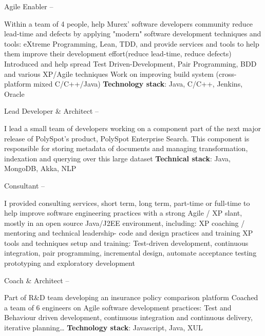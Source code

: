 \documentclass[a4paper,MMMyyyy,nonstopmode]{simpleresumecv}
\begin{document}
\begin{Body}
\Entry
Agile Enabler
\hfill
{} --
\begin{Detail}
\BulletItem Within a team of 4 people, help Murex' software developers community reduce lead-time and defects by applying "modern" software development techniques and tools: eXtreme Programming, Lean, TDD, and provide services and tools to help them improve their development effort(reduce lead-time, reduce defects)
\BulletItem Introduced and help spread Test Driven-Development, Pair Programming, BDD and various XP/Agile techniques
\BulletItem Work on improving build system (cross-platform mixed C/C++/Java)
\BulletItem \textbf{Technology stack}: Java, C/C++, Jenkins, Oracle
\end{Detail}


\Entry
Lead Developer \& Architect
\hfill
{} --
\begin{Detail}
\BulletItem I lead a small team of developers working on a component part of the next major release of PolySpot's product, PolySpot Enterprise Search.
\BulletItem This component is responsible for storing metadata of documents and managing transformation, indexation and querying over this large dataset
\BulletItem \textbf{Technical stack}: Java, MongoDB, Akka, NLP
\end{Detail}

\Entry
Consultant
\hfill
{} --
\begin{Detail}
\BulletItem I provided consulting services, short term, long term, part-time or full-time to help improve software engineering practices with a strong Agile / XP slant, mostly in an open source Java/J2EE environment, including:
\SubBulletItem XP coaching / mentoring and technical leadership- code and design practices and training
\SubBulletItem XP tools and techniques setup and training: Test-driven development, continuous integration, pair programming, incremental design, automate acceptance testing
\SubBulletItem prototyping and exploratory development
\end{Detail}

\Entry
Coach \& Architect
\hfill
{} --
\begin{Detail}
  \BulletItem Part of R\&D team developing an insurance policy comparison platform
  \BulletItem Coached a team of 6 engineers on Agile software development practices: Test and Behaviour driven development, continuous integration and continuous delivery, iterative planning…
  \BulletItem \textbf{Technology stack}: Javascript, Java, XUL
\end{Detail}


\end{Body}
\end{document}

